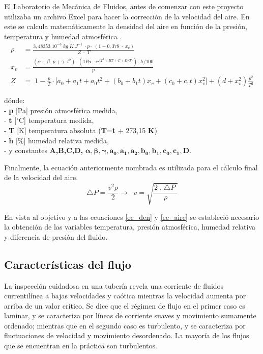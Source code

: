 
El Laboratorio de Mecánica de Fluidos, antes de comenzar con este proyecto utilizaba un archivo Excel para hacer la corrección de la velocidad del aire. En este se calcula matemáticamente la densidad del aire en función de la presión, temperatura y humedad atmosférica \cite{airecalculo}.
\begin{align}
	\rho&=\frac{3,48353\;10^{-3}\;kg\;K\;J^{-1}\;\cdot p\cdot\;(1-0,378\;\cdot\;x_v)}{Z\;\cdot\;T} \label{ec_den}\\
	x_v&=\frac{(\alpha+\beta\cdot p+\gamma\cdot t^2)\cdot(1Pa\cdot\;e^{AT^2+BT+C+D/T)})\cdot h/100}p\\
	Z&=\;1-\frac pT\cdot\lbrack a_0+a_1t+a_0t^2+(b_0+b_1t)x_v+(c_0+c_1t)x_v^2\rbrack+(d+x_v^2)\frac{p^2}{T^2}
\end{align}

dónde:\\
- \textbf{p } [Pa] presión atmosférica medida,\\
- \textbf{t } [$^{\circ}$C] temperatura medida,\\
- \textbf{T } [K] temperatura absoluta (\textbf{T}=\textbf{t} + 273,15 \textbf{K})\\
- \textbf{h } [\%] humedad relativa medida,\\
- y constantes \textbf{A,B,C,D,} $\boldsymbol{\alpha , \beta  , \gamma , a_0, a_1 ,a_2 ,b_0  ,b_1 , c_0 , c_1, D. }$


Finalmente, la ecuación anteriormente nombrada es utilizada para el cálculo final de la velocidad del aire.
\begin{equation}
	\triangle P=\frac{v^2\rho}2\rightarrow\;\;v=\sqrt{\frac{2\;.\;\triangle P\;}\rho}
	\label{ec_aire}
\end{equation}

En vista al objetivo y a las ecuaciones \ref{ec_den} y \ref{ec_aire} se estableció necesario la obtención de las variables temperatura, presión atmosférica, humedad relativa y diferencia de presión del fluido. 

\subsection{Características del flujo}
La inspección cuidadosa en una tubería revela una corriente de fluidos currentilínea a bajas velocidades y caótica mientras la velocidad aumenta por arriba de un valor crítico. Se dice que el régimen de flujo en el primer caso es laminar, y se caracteriza por líneas de corriente suaves y movimiento sumamente
ordenado; mientras que en el segundo caso es turbulento, y se caracteriza por
fluctuaciones de velocidad y movimiento  desordenado. La mayoría de los flujos que se encuentran en la
práctica son turbulentos. 

